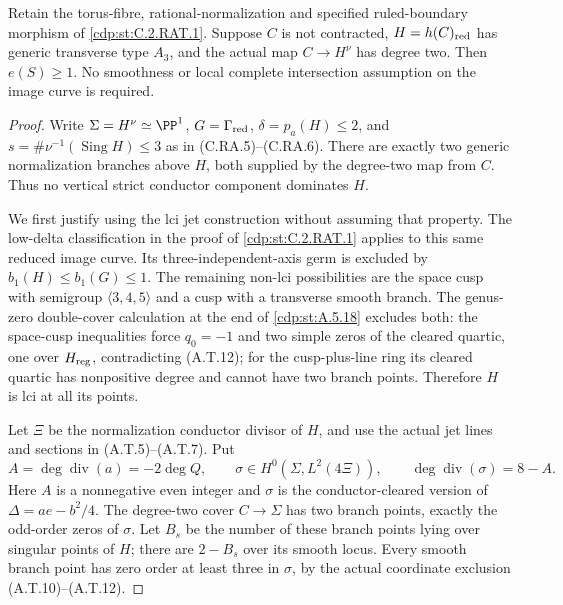 
\begin{proposition}\label{cdp:st:C.2.RAT.4}
Retain the torus-fibre, rational-normalization and specified
ruled-boundary morphism of \ref{cdp:st:C.2.RAT.1}. Suppose $C$ is not
contracted, $H=h(C)_{\rm red}$ has generic transverse type
$A_3$, and the actual map $C\to H^\nu$ has degree two.
Then $e(S)\ge1$. No smoothness or local complete intersection
assumption on the image curve is required.
\end{proposition}
\begin{proof}
Write $\Sigma=H^\nu\simeq\PP^1$, $G=\Gamma_{\rm red}$,
$\delta=p_a(H)\le2$, and
$s=\#\nu^{-1}(\operatorname{Sing}H)\le3$ as in
(C.RA.5)--(C.RA.6). There are exactly two generic
normalization branches above $H$, both supplied by the
degree-two map from $C$. Thus no vertical strict conductor
component dominates $H$.

We first justify using the lci jet construction without
assuming that property. The low-delta classification in the
proof of \ref{cdp:st:C.2.RAT.1} applies to this same reduced image curve.
Its three-independent-axis germ is excluded by
$b_1(H)\le b_1(G)\le1$. The remaining non-lci possibilities
are the space cusp with semigroup $\langle3,4,5\rangle$
and a cusp with a transverse smooth branch. The
genus-zero double-cover calculation at the end of \ref{cdp:st:A.5.18}
excludes both: the space-cusp inequalities force
$q_0=-1$ and two simple zeros of the cleared quartic,
one over $H_{\rm reg}$, contradicting (A.T.12); for the
cusp-plus-line ring its cleared quartic has nonpositive
degree and cannot have two branch points. Therefore $H$
is lci at all its points.

Let $\Xi$ be the normalization conductor divisor of $H$,
and use the actual jet lines and sections in
(A.T.5)--(A.T.7). Put
\[
 A=\deg\operatorname{div}(a)=-2\deg Q,\qquad
 \sigma\in H^0(\Sigma,L^2(4\Xi)),\qquad
 \deg\operatorname{div}(\sigma)=8-A.
\tag{C.RA.26}\label{cdp:eq:C.RA.26}
\]
Here $A$ is a nonnegative even integer and $\sigma$ is
the conductor-cleared version of $\Delta=ae-b^2/4$.
The degree-two cover $C\to\Sigma$ has two branch points,
exactly the odd-order zeros of $\sigma$. Let $B_s$ be
the number of these branch points lying over singular
points of $H$; there are $2-B_s$ over its smooth locus.
Every smooth branch point has zero order at least three
in $\sigma$, by the actual coordinate exclusion
(A.T.10)--(A.T.12).


\end{proof}
